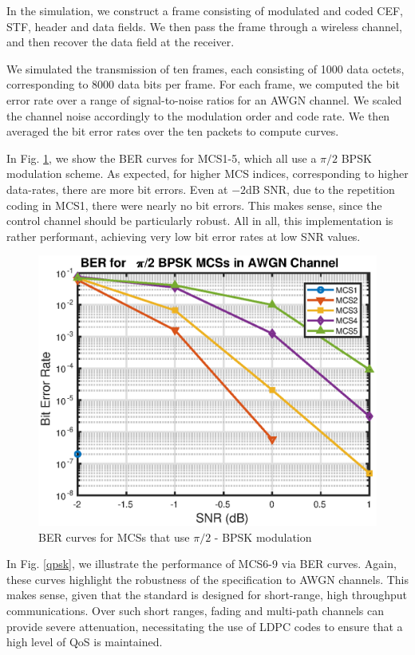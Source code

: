 \documentclass[conference]{IEEEtran}
\begin{document}
In the simulation, we construct a frame consisting of modulated and coded CEF, STF, header and data fields. We then pass the frame through a wireless channel, and then recover the data field at the receiver. 

We simulated the transmission of ten frames, each consisting of 1000 data octets, corresponding to 8000 data bits per frame. For each frame, we computed the bit error rate over a range of signal-to-noise ratios for an AWGN channel. We scaled the channel noise accordingly to the modulation order and code rate. We then averaged the bit error rates over the ten packets to compute curves. 

In Fig. \ref{bpsk}, we show the BER curves for MCS1-5, which all use a $\pi/2$ BPSK modulation scheme. As expected, for higher MCS indices, corresponding to higher data-rates, there are more bit errors. Even at $-2$dB SNR, due to the repetition coding in MCS1, there were nearly no bit errors. This makes sense, since the control channel should be particularly robust. All in all, this implementation is rather performant, achieving very low bit error rates at low SNR values. 


\begin{figure}[htp]
\centerline{\includegraphics[scale=.6]{./media/bpsk.eps}}
\caption{BER curves for MCSs that use $\pi/2$ - BPSK modulation}
\label{bpsk}
\end{figure} 

In Fig. \ref{qpsk}, we illustrate the performance of MCS6-9 via BER curves. Again, these curves highlight the robustness of the specification to AWGN channels. This makes sense, given that the standard is designed for short-range, high throughput communications. Over such short ranges, fading and multi-path channels can provide severe attenuation, necessitating the use of LDPC codes to ensure that a high level of QoS is maintained.  
\end{document}
